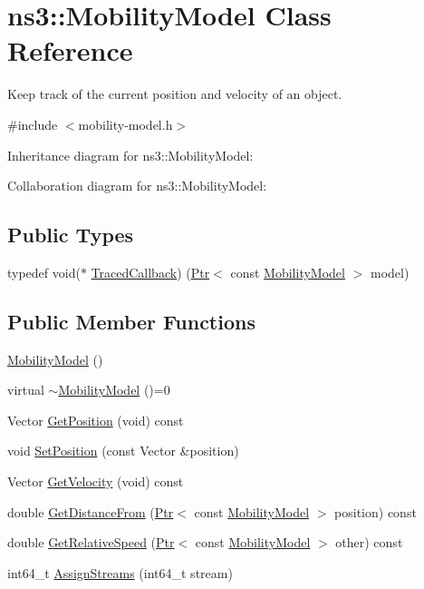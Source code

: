 \hypertarget{classns3_1_1MobilityModel}{}\section{ns3\+:\+:Mobility\+Model Class Reference}
\label{classns3_1_1MobilityModel}


Keep track of the current position and velocity of an object.  




{\ttfamily \#include $<$mobility-\/model.\+h$>$}



Inheritance diagram for ns3\+:\+:Mobility\+Model\+:


Collaboration diagram for ns3\+:\+:Mobility\+Model\+:
\subsection*{Public Types}
\begin{DoxyCompactItemize}
\item 
typedef void($\ast$ \hyperlink{classns3_1_1MobilityModel_a1bcfc7397046b2b04713a52884a417af}{Traced\+Callback}) (\hyperlink{classns3_1_1Ptr}{Ptr}$<$ const \hyperlink{classns3_1_1MobilityModel}{Mobility\+Model} $>$ model)
\end{DoxyCompactItemize}
\subsection*{Public Member Functions}
\begin{DoxyCompactItemize}
\item 
\hyperlink{classns3_1_1MobilityModel_af61ca3dbc723d8109d115fb081fd0299}{Mobility\+Model} ()
\item 
virtual \hyperlink{classns3_1_1MobilityModel_a22cb52e9511306e986f3436023748a6a}{$\sim$\+Mobility\+Model} ()=0
\item 
Vector \hyperlink{classns3_1_1MobilityModel_aba838f06ec5bbb2d193d94b8c0e4abb4}{Get\+Position} (void) const 
\item 
void \hyperlink{classns3_1_1MobilityModel_ac584b3d5a309709d2f13ed6ada1e7640}{Set\+Position} (const Vector \&position)
\item 
Vector \hyperlink{classns3_1_1MobilityModel_a77004c56b45773bf57bdd3750887ced3}{Get\+Velocity} (void) const 
\item 
double \hyperlink{classns3_1_1MobilityModel_afa16c20b3c5fd135be075000f0272f31}{Get\+Distance\+From} (\hyperlink{classns3_1_1Ptr}{Ptr}$<$ const \hyperlink{classns3_1_1MobilityModel}{Mobility\+Model} $>$ position) const 
\item 
double \hyperlink{classns3_1_1MobilityModel_a914dc94a62dcc933b88761d95d074f49}{Get\+Relative\+Speed} (\hyperlink{classns3_1_1Ptr}{Ptr}$<$ const \hyperlink{classns3_1_1MobilityModel}{Mobility\+Model} $>$ other) const 
\item 
int64\+\_\+t \hyperlink{classns3_1_1MobilityModel_a690c1feae89068adc79181d0922a731c}{Assign\+Streams} (int64\+\_\+t stream)
\end{DoxyCompactItemize}
